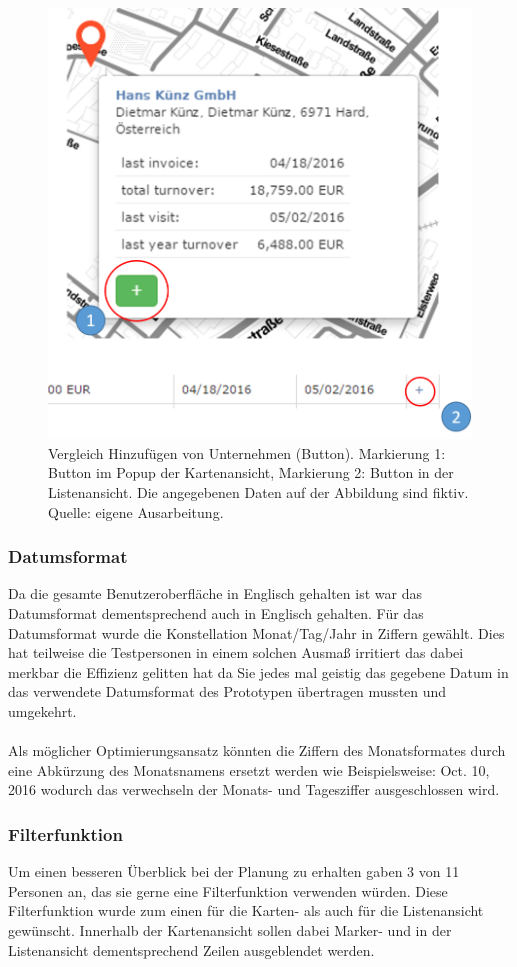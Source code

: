 \documentclass[Bachelorarbeit.tex]{subfiles}
\begin{document}
\begin{figure}[h]
	\centering
	\includegraphics[width=0.7\linewidth]{img/Evaluation/Userfeedback/Add}
	\caption[Vergleich: Button Karte- und Listenansicht]{Vergleich Hinzufügen von Unternehmen (Button). Markierung 1: Button im Popup der Kartenansicht, Markierung 2: Button in der Listenansicht. Die angegebenen Daten auf der Abbildung sind fiktiv. Quelle: eigene Ausarbeitung.}
	\label{fig:Add}
\end{figure}

\subsubsection*{Datumsformat}
Da die gesamte Benutzeroberfläche in Englisch gehalten ist war das Datumsformat dementsprechend auch in Englisch gehalten. 
Für das Datumsformat wurde die Konstellation Monat/Tag/Jahr in Ziffern gewählt. 
Dies hat teilweise die Testpersonen in einem solchen Ausmaß irritiert das dabei merkbar die Effizienz gelitten hat da Sie jedes mal geistig das gegebene Datum in das verwendete Datumsformat des Prototypen übertragen mussten und umgekehrt.\\
\\
Als möglicher Optimierungsansatz könnten die Ziffern des Monatsformates durch eine Abkürzung des Monatsnamens ersetzt werden wie Beispielsweise: Oct. 10, 2016 wodurch das verwechseln der Monats- und Tagesziffer ausgeschlossen wird.  

\subsubsection*{Filterfunktion}
Um einen besseren Überblick bei der Planung zu erhalten gaben 3 von 11 Personen an, das sie gerne eine Filterfunktion verwenden würden.  
Diese Filterfunktion wurde zum einen für die Karten- als auch für die Listenansicht gewünscht.
Innerhalb der Kartenansicht sollen dabei Marker- und in der Listenansicht dementsprechend Zeilen ausgeblendet werden.
 
\end{document}
